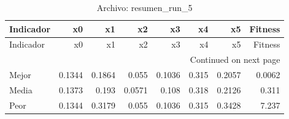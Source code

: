\begin{longtable}{lrrrrrrr}
\caption{Archivo: resumen\_run\_5}\label{tab:resumen_run_5} \\
\toprule
Indicador & x0 & x1 & x2 & x3 & x4 & x5 & Fitness \\
\midrule
\endfirsthead
\toprule
Indicador & x0 & x1 & x2 & x3 & x4 & x5 & Fitness \\
\midrule
\endhead
\midrule
\multicolumn{8}{r}{Continued on next page} \\
\midrule
\endfoot
\bottomrule
\endlastfoot
Mejor & 0.1344 & 0.1864 & 0.055 & 0.1036 & 0.315 & 0.2057 & 0.0062 \\
Media & 0.1373 & 0.193 & 0.0571 & 0.108 & 0.318 & 0.2126 & 0.311 \\
Peor & 0.1344 & 0.3179 & 0.055 & 0.1036 & 0.315 & 0.3428 & 7.237 \\
\end{longtable}